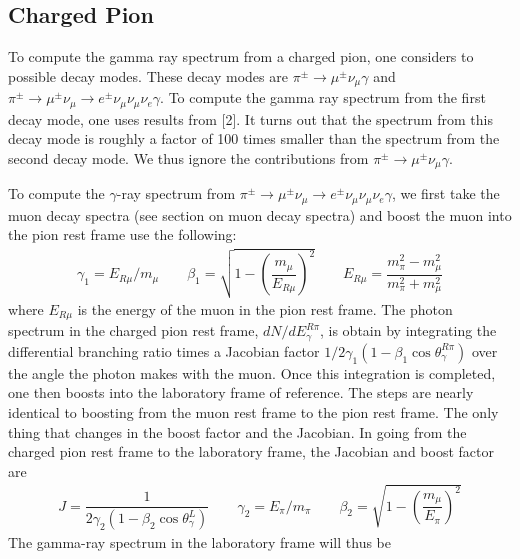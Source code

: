 \documentclass[letterpaper,10pt,english]{sphinxmanual}
\begin{document}
\subsection{Charged Pion}
\label{\detokenize{description:charged-pion}}
To compute the gamma ray spectrum from a charged pion, one considers to possible decay modes. These decay modes are \(\pi^{\pm} \to \mu^{\pm}\nu_{\mu}\gamma\) and \(\pi^{\pm} \to \mu^{\pm}\nu_{\mu} \to e^{\pm}\nu_{\mu}\nu_{\mu}\nu_{e}\gamma\). To compute the gamma ray spectrum from the first decay mode, one uses results from {[}2{]}. It turns out that the spectrum from this decay mode is roughly a factor of 100 times smaller than the spectrum from the second decay mode. We thus ignore the contributions from \(\pi^{\pm} \to \mu^{\pm}\nu_{\mu}\gamma\).

To compute the \(\gamma\)-ray spectrum from \(\pi^{\pm} \to \mu^{\pm}\nu_{\mu} \to e^{\pm}\nu_{\mu}\nu_{\mu}\nu_{e}\gamma\), we first take the muon decay spectra (see section on muon decay spectra) and boost the muon into the pion rest frame use the following:
\begin{equation*}
\begin{split}\gamma_{1} = E_{R\mu}/m_{\mu} \qquad
\beta_{1} = \sqrt{1-\left(\dfrac{m_{\mu}}{E_{R\mu}}\right)^2} \qquad  E_{R\mu} = \dfrac{m_{\pi}^2 - m_{\mu}^2}{m_{\pi}^2 + m_{\mu}^2}\end{split}
\end{equation*}
where \(E_{R\mu}\) is the energy of the muon in the pion rest frame. The photon spectrum in the charged pion rest frame, \(dN/dE_{\gamma}^{R\pi}\), is obtain by integrating the differential branching ratio times a Jacobian factor \(1/2\gamma_{1}(1-\beta_{1}\cos\theta_{\gamma}^{R\pi})\) over the
angle the photon makes with the muon. Once this integration is completed, one then boosts into the laboratory frame of reference. The steps are nearly identical to boosting from the muon rest frame to the pion rest frame. The only thing that changes in the boost factor and the Jacobian. In going from the charged pion rest frame to the laboratory frame, the Jacobian and boost factor are
\begin{equation*}
\begin{split}J = \dfrac{1}{2\gamma_{2}(1-\beta_{2}\cos\theta_{\gamma}^{L})} \qquad
\gamma_{2} = E_{\pi} / m_{\pi} \qquad
\beta_{2} = \sqrt{1 - \left(\dfrac{m_{\mu}}{E_{\pi}}\right)^2}\end{split}
\end{equation*}
The gamma-ray spectrum in the laboratory frame will thus be
\end{document}
